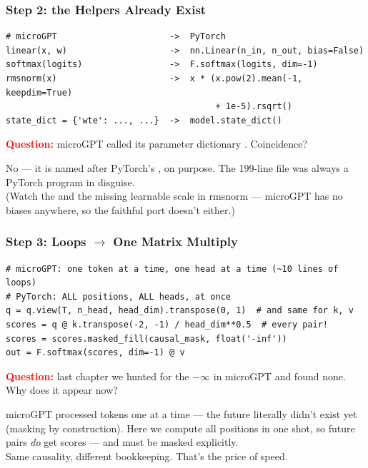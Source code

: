 \begin{frame}[fragile]
    \frametitle{Step 2: the Helpers Already Exist}

\begin{lstlisting}
# microGPT                      ->  PyTorch
linear(x, w)                    ->  nn.Linear(n_in, n_out, bias=False)
softmax(logits)                 ->  F.softmax(logits, dim=-1)
rmsnorm(x)                      ->  x * (x.pow(2).mean(-1, keepdim=True)
                                         + 1e-5).rsqrt()
state_dict = {'wte': ..., ...}  ->  model.state_dict()
\end{lstlisting}

    \pause

    \textcolor{red}{\textbf{Question:}} microGPT called its parameter dictionary . Coincidence?

    \pause

    No --- it is named \alert{after PyTorch's} , on purpose. The 199-line file was always a PyTorch program in disguise. \\[2mm]
    {\footnotesize (Watch the  and the missing learnable scale in rmsnorm --- microGPT has no biases anywhere, so the faithful port doesn't either.)}
\end{frame}

\begin{frame}[fragile]
    \frametitle{Step 3: Loops $\to$ One Matrix Multiply}

\begin{lstlisting}
# microGPT: one token at a time, one head at a time (~10 lines of loops)
# PyTorch: ALL positions, ALL heads, at once
q = q.view(T, n_head, head_dim).transpose(0, 1)  # and same for k, v
scores = q @ k.transpose(-2, -1) / head_dim**0.5  # every pair!
scores = scores.masked_fill(causal_mask, float('-inf'))
out = F.softmax(scores, dim=-1) @ v
\end{lstlisting}

    \pause

    \textcolor{red}{\textbf{Question:}} last chapter we hunted for the $-\infty$ in microGPT and found \alert{none}. Why does it appear now?

    \pause

    microGPT processed tokens \alert{one at a time} --- the future literally didn't exist yet (masking by construction). Here we compute \alert{all positions in one shot}, so future pairs \emph{do} get scores --- and must be masked explicitly. \\[1mm]
    \alert{Same causality, different bookkeeping.} That's the price of speed.
\end{frame}

